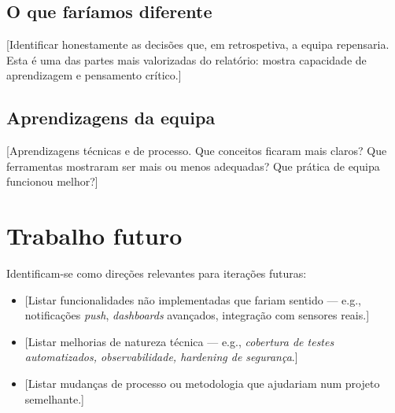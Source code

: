 \subsection{O que faríamos diferente}

[Identificar honestamente as decisões que, em retrospetiva, a
equipa repensaria. Esta é uma das partes mais valorizadas do
relatório: mostra capacidade de aprendizagem e pensamento
crítico.]

\subsection{Aprendizagens da equipa}

[Aprendizagens técnicas e de processo. Que conceitos ficaram mais
claros? Que ferramentas mostraram ser mais ou menos adequadas? Que
prática de equipa funcionou melhor?]


\section{Trabalho futuro}
\label{sec:futuro}


Identificam-se como direções relevantes para iterações futuras:

\begin{itemize}
  \item {}[Listar funcionalidades não implementadas que fariam sentido — e.g., notificações \emph{push}, \emph{dashboards} avançados, integração com sensores reais.]
  \item {}[Listar melhorias de natureza técnica — e.g., \emph{cobertura de testes automatizados, observabilidade, hardening de segurança}.]
  \item {}[Listar mudanças de processo ou metodologia que ajudariam num projeto semelhante.]
\end{itemize}
